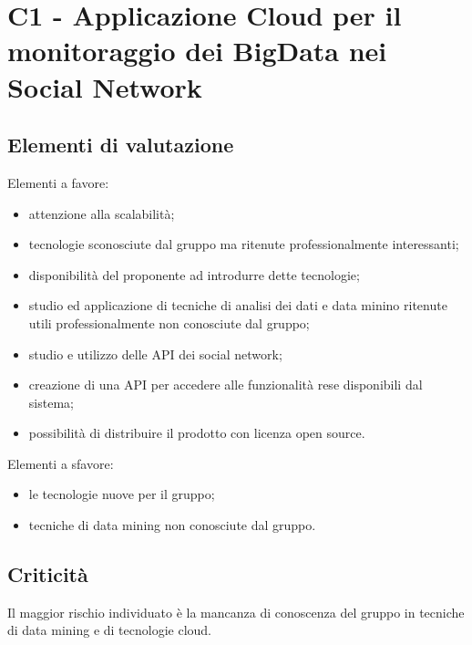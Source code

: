 \section{C1 - Applicazione Cloud per il monitoraggio dei BigData nei Social Network}{
	\subsection{Elementi di valutazione}{
		Elementi a favore:
		\begin{itemize}
			\item attenzione alla scalabilità;
			\item tecnologie sconosciute dal gruppo ma ritenute professionalmente interessanti;
			\item disponibilità del proponente ad introdurre dette tecnologie;
			\item studio ed applicazione di tecniche di analisi dei dati e data minino ritenute utili professionalmente non conosciute dal gruppo;
			\item studio e utilizzo delle API dei social network;
			\item creazione di una API per accedere alle funzionalità rese disponibili dal sistema;
			\item possibilità di distribuire il prodotto con licenza open source.
		\end{itemize}
		
		Elementi a sfavore:
		\begin{itemize}
			\item le tecnologie nuove per il gruppo;
			\item tecniche di data mining non conosciute dal gruppo.
		\end{itemize}
	}
	\subsection{Criticità}{
		Il maggior rischio individuato è la mancanza di conoscenza del gruppo in tecniche di data mining e di tecnologie cloud.
	}
}
